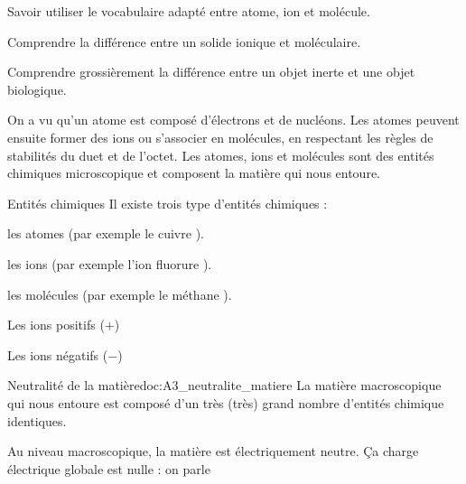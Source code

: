 \teteSndMole

\vspace*{-32pt}


\begin{objectifs}
  \item Savoir utiliser le vocabulaire adapté entre atome, ion et molécule.
  \item Comprendre la différence entre un solide ionique et moléculaire.
  \item Comprendre grossièrement la différence entre un objet inerte et une objet biologique.
\end{objectifs}

\begin{contexte}
  On a vu qu'un atome est composé d'électrons et de nucléons.
  Les atomes peuvent ensuite former des ions ou s'associer en molécules, en respectant les règles de stabilités du duet et de l'octet.
  Les atomes, ions et molécules sont des entités chimiques microscopique et composent la matière qui nous entoure.

  
  
\end{contexte}



\begin{doc}{Entités chimiques}
  Il existe trois type d'entités chimiques :
  \begin{listePoints}
    \item les atomes (par exemple le cuivre ).
    \item les ions (par exemple l'ion fluorure ).
    \item les molécules (par exemple le méthane ).
  \end{listePoints}
  
  \begin{importants}
    Les ions positifs ($+$) 
    
    Les ions négatifs ($-$) 
  \end{importants}
\end{doc}

\begin{doc}{Neutralité de la matière}{doc:A3_neutralite_matiere}
  La matière macroscopique qui nous entoure est composé d'un très (très) grand nombre d'entités chimique identiques.
  
  \begin{importants}
    Au niveau macroscopique, la matière est électriquement neutre.
    Ça charge électrique globale est nulle : on parle 
  \end{importants}
\end{doc}

